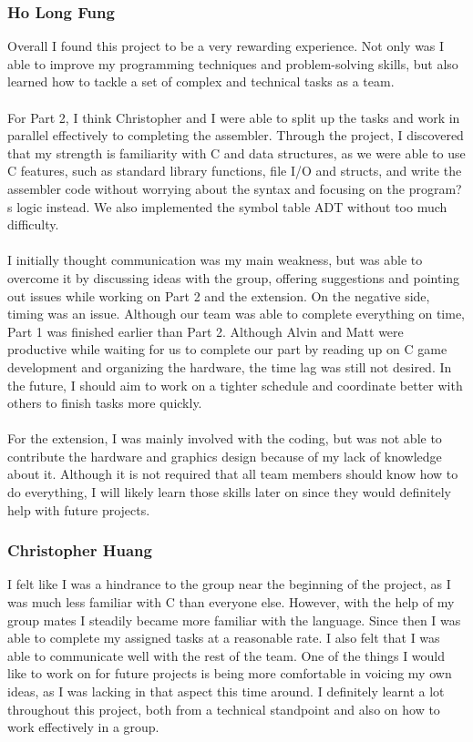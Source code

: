 \documentclass[11pt,twoside]{article}
\begin{document}
\subsubsection{Ho Long Fung}
Overall I found this project to be a very rewarding experience. Not only was I able to improve my programming techniques and problem-solving skills, but also learned how to tackle a set of complex and technical tasks as a team.
\\\\
For Part 2, I think Christopher and I were able to split up the tasks and work in parallel effectively to completing the assembler. Through the project, I discovered that my strength is familiarity with C and data structures, as we were able to use C features, such as standard library functions, file I/O and structs, and write the assembler code without worrying about the syntax and focusing on the program?s logic instead. We also implemented the symbol table ADT without too much difficulty.
\\\\
I initially thought communication was my main weakness, but was able to overcome it by discussing ideas with the group, offering suggestions and pointing out issues while working on Part 2 and the extension. On the negative side, timing was an issue. Although our team was able to complete everything on time, Part 1 was finished earlier than Part 2. Although Alvin and Matt were productive while waiting for us to complete our part by reading up on C game development and organizing the hardware, the time lag was still not desired. In the future, I should aim to work on a tighter schedule and coordinate better with others to finish tasks more quickly.
\\\\
For the extension, I was mainly involved with the coding, but was not able to contribute the hardware and graphics design because of my lack of knowledge about it. Although it is not required that all team members should know how to do everything, I will likely learn those skills later on since they would definitely help with future projects.

\subsubsection{Christopher Huang}
I felt like I was a hindrance to the group near the beginning of the project, as I was much less familiar with C than everyone else.  However, with the help of my group mates I steadily became more familiar with the language.  Since then I was able to complete my assigned tasks at a reasonable rate.  I also felt that I was able to communicate well with the rest of the team.  One of the things I would like to work on for future projects is being more comfortable in voicing my own ideas, as I was lacking in that aspect this time around.  I definitely learnt a lot throughout this project, both from a technical standpoint and also on how to work effectively in a group.  
\end{document}
